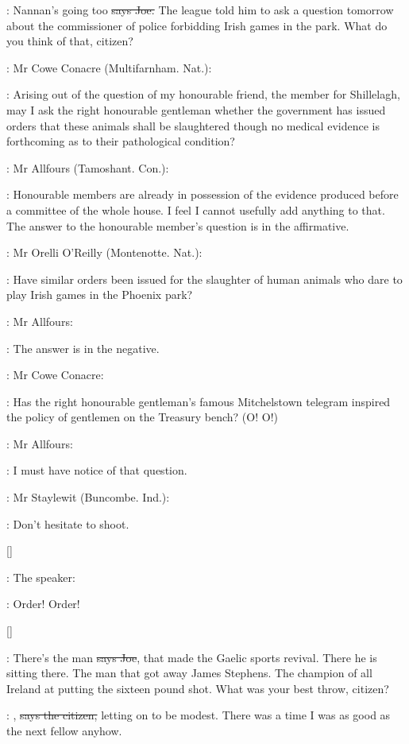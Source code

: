 \joe:
Nannan's going too
\sout{says Joe.}
The league told him to ask a question
tomorrow about the commissioner of police forbidding Irish games in the
park.
What do you think of that,
citizen?

:
Mr Cowe Conacre (Multifarnham.
Nat.):

\conacre:
Arising out of the question of my
honourable friend,
the member for Shillelagh,
may I ask the right
honourable gentleman whether the government has issued orders that these
animals shall be slaughtered though no medical evidence is forthcoming as
to their pathological condition?

:
Mr Allfours (Tamoshant.
Con.):

\allfours:
Honourable members are already in
possession of the evidence produced before a committee of the whole house.
I feel I cannot usefully add anything to that.
The answer to the
honourable member's question is in the affirmative.

:
Mr Orelli O'Reilly (Montenotte.
Nat.):


\oreilly:
Have similar orders been issued for
the slaughter of human animals
who dare to play Irish games in the
Phoenix park?

:
Mr Allfours:


\allfours:
The answer is in the negative.

:
Mr Cowe Conacre:


\conacre:
Has the right honourable gentleman's famous
Mitchelstown telegram inspired the policy of gentlemen on the Treasury
bench?
(O!
O!)

:
Mr Allfours:


\allfours:
I must have notice of that question.

:
Mr Staylewit (Buncombe.
Ind.):


\staylewit:
Don't hesitate to shoot.

[]

:
The speaker:

\Speaker:
Order!
Order!

[]

\joe:
There's the man
\sout{says Joe},
that made the Gaelic sports revival.
There he
is sitting there.
The man that got away James Stephens.
The champion of
all Ireland at putting the sixteen pound shot.
What was your best throw,
citizen?

\citizen:
,
\sout{says the citizen,}
letting on to be modest.
There was a time
I was as good as the next fellow anyhow.

